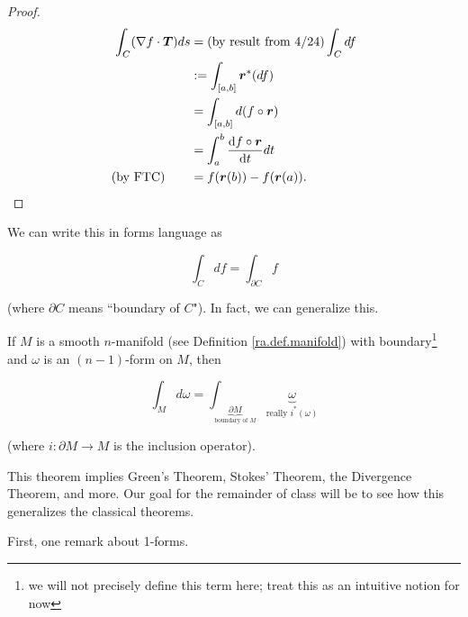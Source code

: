 \begin{proof}

\begin{align*}
\int_C (\nabla f \cdot \boldsymbol{T}) ds & = \text{(by result from 4/24)} \int_C df
\\ & := \int_{[a,b]} \boldsymbol{r}^*(df) 
\\ & = \int_{[a,b]} d(f \circ \boldsymbol{r})
\\ & = \int_a^b \deriv{f \circ \boldsymbol{r}}{t} dt 
\\ \text{(by FTC)} \qquad & = f(\boldsymbol{r}(b)) - f(\boldsymbol{r}(a)).
\end{align*}

\end{proof}

We can write this in forms language as 

\[
\int_C df = \int_{\partial C} f
\]

(where \(\partial C\) means ``boundary of \(C\)"). In fact, we can generalize this.

\begin{theorem}

If \(M\) is a smooth \(n\)-manifold (see Definition \ref{ra.def.manifold}) with boundary\footnote{we will not precisely define this term here; treat this as an intuitive notion for now} and \(\omega\) is an \((n-1)\)-form on \(M\), then

\[
\int_M d \omega = \int_{\underbrace{\partial M}_{\text{boundary of } M} }\underbrace{\omega}_{\text{really } i^*(\omega)}
\]

(where \(i: \partial M \to M\) is the inclusion operator).

\end{theorem}

\begin{remark}

This theorem implies Green's Theorem, Stokes' Theorem, the Divergence Theorem, and more. Our goal for the remainder of class will be to see how this generalizes the classical theorems.

\end{remark}

First, one remark about 1-forms.

